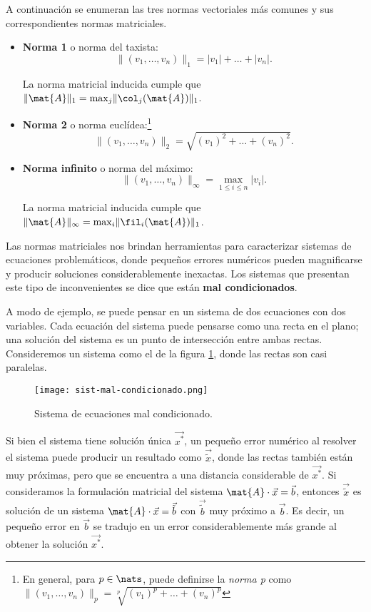 A continuación se enumeran las tres normas vectoriales más comunes y sus
correspondientes normas matriciales.
\begin{itemize}
\item \textbf{Norma 1} o norma del taxista:
    \[ \lVert (v_1, \dots, v_n) \rVert_1
        = \lvert v_1 \rvert + \dots + \lvert v_n \rvert. \]

    La norma matricial inducida cumple que $\lVert \mat{A} \rVert_1
    = \max_{j} \lVert \col_j(\mat{A}) \rVert_1$.

\item \textbf{Norma 2} o norma euclídea:\footnote{En general,
    para $p \in \nats$, puede definirse la \emph{norma p}
    como $\lVert (v_1, \dots, v_n) \rVert_p
    = \sqrt[p]{(v_1)^p + \dots + (v_n)^p}$}
    \[ \lVert (v_1, \dots, v_n) \rVert_2
        = \sqrt{(v_1)^2 + \dots + (v_n)^2}. \]

\item \textbf{Norma infinito} o norma del máximo:
    \[ \lVert (v_1, \dots, v_n) \rVert_\infty
        = \max_{1 \leq i \leq n} \lvert v_i \rvert. \]

    La norma matricial inducida cumple que $\lVert \mat{A} \rVert_\infty
    = \max_{i} \lVert \fil_i(\mat{A}) \rVert_1$.
\end{itemize}

Las normas matriciales nos brindan herramientas para caracterizar sistemas de
ecuaciones problemáticos, donde pequeños errores numéricos pueden magnificarse
y producir soluciones considerablemente inexactas. Los sistemas que presentan
este tipo de inconvenientes se dice que están \textbf{mal condicionados}.

A modo de ejemplo, se puede pensar en un sistema de dos ecuaciones con dos
variables. Cada ecuación del sistema puede pensarse como una
recta en el plano; una solución del sistema es un punto de intersección
entre ambas rectas. Consideremos un sistema como el de la figura
\ref{fig:sist-mal-condicionado}, donde las rectas son casi paralelas.

\begin{figure}[H]
\centering
\texttt{[image: sist-mal-condicionado.png]}
\caption{Sistema de ecuaciones mal condicionado.}
\label{fig:sist-mal-condicionado}
\end{figure}

Si bien el sistema tiene solución única $\vec{x^\ast}$, un pequeño error
numérico al resolver el sistema puede producir un resultado como
$\vec{\tilde x}$, donde las rectas también están muy próximas, pero que
se encuentra a una distancia considerable de $\vec{x^\ast}$.
Si consideramos la formulación matricial del sistema $\mat{A} \cdot \vec{x} =
\vec{b}$, entonces $\vec{\tilde x}$ es solución de un sistema $\mat{A} \cdot
\vec{x} = \vec{\tilde b}$ con $\vec{\tilde b}$ muy próximo a $\vec{b}$.
Es decir, un pequeño error en $\vec{b}$ se tradujo en un error
considerablemente más grande al obtener la solución $\vec{x^\ast}$.

